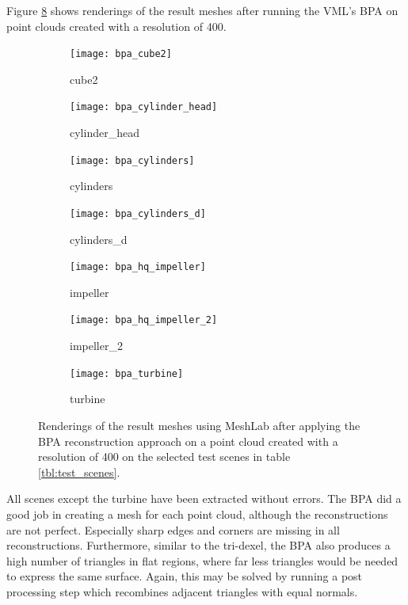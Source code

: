 Figure \ref{fig:bpa_results} shows renderings of the result meshes after running the VML's BPA on point clouds created with a resolution of 400.
%
\begin{figure}
	\centering
	\begin{subfigure}[b]{0.34\textwidth}
		\centering
		\texttt{[image: bpa\_cube2]}
		\caption{cube2}
		\label{fig:bpa_cube2}
	\end{subfigure}
	\hspace{1cm}
	\begin{subfigure}[b]{0.34\textwidth}
		\centering
		\texttt{[image: bpa\_cylinder\_head]}
		\caption{cylinder\_head}
		\label{fig:bpa_cylinder_head}
	\end{subfigure}
	\begin{subfigure}[b]{0.34\textwidth}
		\centering
		\texttt{[image: bpa\_cylinders]}
		\caption{cylinders}
		\label{fig:bpa_cylinders}
	\end{subfigure}
	\hspace{1cm}
	\begin{subfigure}[b]{0.34\textwidth}
		\centering
		\texttt{[image: bpa\_cylinders\_d]}
		\caption{cylinders\_d}
		\label{fig:bpa_cylinders_d}
	\end{subfigure}
	\begin{subfigure}[b]{0.34\textwidth}
		\centering
		\texttt{[image: bpa\_hq\_impeller]}
		\caption{impeller}
		\label{fig:bpa_hq_impeller}
	\end{subfigure}
	\hspace{1cm}
	\begin{subfigure}[b]{0.34\textwidth}
		\centering
		\texttt{[image: bpa\_hq\_impeller\_2]}
		\caption{impeller\_2}
		\label{fig:bpa_hq_impeller_2}
	\end{subfigure}
	\begin{subfigure}[b]{0.33\textwidth}
		\centering
		\texttt{[image: bpa\_turbine]}
		\caption{turbine}
		\label{fig:bpa_turbine}
	\end{subfigure}
	\caption{
		Renderings of the result meshes using MeshLab after applying the BPA reconstruction approach on a point cloud created with a resolution of 400 on the selected test scenes in table \ref{tbl:test_scenes}.
	}
	\label{fig:bpa_results}
\end{figure}
%
All scenes except the turbine have been extracted without errors.
The BPA did a good job in creating a mesh for each point cloud, although the reconstructions are not perfect.
Especially sharp edges and corners are missing in all reconstructions.
Furthermore, similar to the tri-dexel, the BPA also produces a high number of triangles in flat regions, where far less triangles would be needed to express the same surface.
Again, this may be solved by running a post processing step which recombines adjacent triangles with equal normals.

